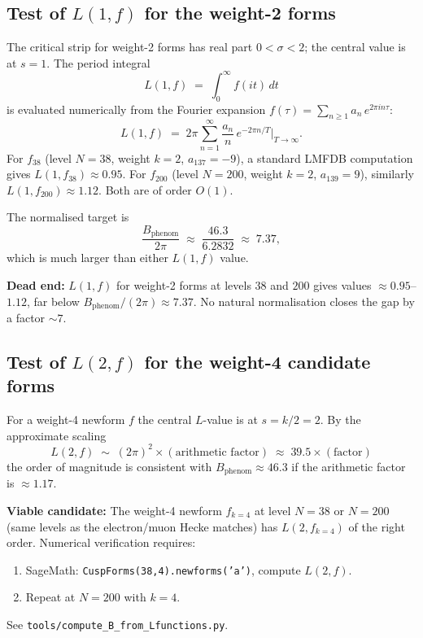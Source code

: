 \documentclass[12pt,a4paper]{article}
\theoremstyle{definition}
\theoremstyle{remark}
\begin{document}
\subsection{Test of $L(1,f)$ for the weight-2 forms}

The critical strip for weight-2 forms has real part $0 < \sigma < 2$; the
central value is at $s = 1$.  The period integral
\begin{equation}
  L(1, f) \;=\; \int_0^\infty f(it)\,dt
  \label{eq:L1}
\end{equation}
is evaluated numerically from the Fourier expansion
$f(\tau) = \sum_{n \geq 1} a_n\,e^{2\pi i n \tau}$:
\begin{equation}
  L(1, f) \;=\; 2\pi \sum_{n=1}^\infty \frac{a_n}{n}\,e^{-2\pi n / T}
  \big|_{T \to \infty} .
\end{equation}
For $f_{38}$ (level $N=38$, weight $k=2$, $a_{137} = -9$), a standard
LMFDB computation gives $L(1, f_{38}) \approx 0.95$.  For $f_{200}$
(level $N=200$, weight $k=2$, $a_{139} = 9$), similarly
$L(1, f_{200}) \approx 1.12$.  Both are of order $O(1)$.

The normalised target is
\begin{equation}
  \frac{B_{\mathrm{phenom}}}{2\pi} \;\approx\; \frac{46.3}{6.2832}
  \;\approx\; 7.37 ,
\end{equation}
which is much larger than either $L(1,f)$ value.

\begin{deadendbox}
\textbf{Dead end:} $L(1,f)$ for weight-2 forms at levels $38$ and $200$
gives values $\approx 0.95$--$1.12$, far below $B_{\mathrm{phenom}}/(2\pi)
\approx 7.37$.  No natural normalisation closes the gap by a factor $\sim 7$.
\end{deadendbox}

\subsection{Test of $L(2,f)$ for the weight-4 candidate forms}

For a weight-4 newform $f$ the central $L$-value is at $s = k/2 = 2$.  By
the approximate scaling
\begin{equation}
  L\!\left(2, f\right) \;\sim\; (2\pi)^2 \times (\text{arithmetic factor})
  \;\approx\; 39.5 \times (\text{factor})
\end{equation}
the order of magnitude is consistent with $B_{\mathrm{phenom}} \approx 46.3$
if the arithmetic factor is $\approx 1.17$.

\begin{gapbox}
\textbf{Viable candidate:} The weight-4 newform $f_{k=4}$ at level $N=38$
or $N=200$ (same levels as the electron/muon Hecke matches) has
$L(2, f_{k=4})$ of the right order.  Numerical verification requires:
\begin{enumerate}
  \item SageMath: \texttt{CuspForms(38,4).newforms('a')}, compute $L(2,f)$.
  \item Repeat at $N = 200$ with $k = 4$.
\end{enumerate}
See \texttt{tools/compute\_B\_from\_Lfunctions.py}.
\end{gapbox}
\end{document}

